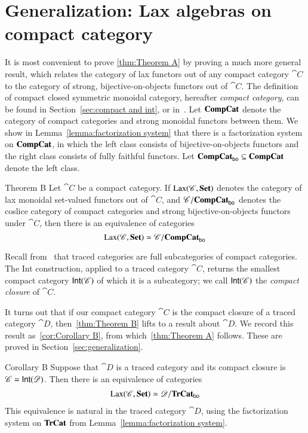 \documentclass[12pt,oneside,article,draft]{memoir}
\begin{document}
\section{Generalization: Lax algebras on compact category}

It is most convenient to prove \ref{thm:Theorem A} by proving a much more general result, which relates the category of lax functors out of any compact category $\cat{C}$ to the category of strong, bijective-on-objects functors out of $\cat{C}$. The definition of compact closed symmetric monoidal category, hereafter \emph{compact category}, can be found in Section~\ref{sec:compact and int}, or in~\cite{MacLane}. Let $\mathbf{CompCat}$ denote the category of compact categories and strong monoidal functors between them. We show in Lemma~\ref{lemma:factorization system} that there is a factorization system on $\mathbf{CompCat}$, in which the left class consists of bijective-on-objects functors and the right class consists of fully faithful functors. Let $\mathbf{CompCat}_{\mathsf{bo}}\subseteq\mathbf{CompCat}$ denote the left class.

\begin{named}{Theorem B}
 Let $\cat{C}$ be a compact category. If $\operatorname{Lax}(\mathscr{C},\mathbf{Set})$ denotes the category of lax monoidal set-valued functors out of $\cat{C}$, and $\mathscr{C}/\mathbf{CompCat}_{\mathsf{bo}}$ denotes the coslice category of compact categories and strong bijective-on-objects functors under $\cat{C}$, then there is an equivalence of categories
\begin{equation}\label{dia:compact lax strong}
  \operatorname{Lax}(\mathscr{C},\mathbf{Set})\simeq\mathscr{C}/\mathbf{CompCat}_{\mathsf{bo}}
\end{equation}
\end{named}


Recall from~\cite{JoyalStreetVerity} that traced categories are full subcategories of compact categories. The Int construction, applied to a traced category $\cat{C}$, returns the smallest compact category $\mathsf{Int}(\mathscr{C})$ of which it is a subcategory; we call $\mathsf{Int}(\mathscr{C})$ the \emph{compact closure} of $\cat{C}$. 

It turns out that if our compact category $\cat{C}$ is the compact closure of a traced category $\cat{D}$, then~\ref{thm:Theorem B} lifts to a result about $\cat{D}$. We record this result as~\ref{cor:Corollary B}, from which~\ref{thm:Theorem A} follows. These are proved in Section~\ref{sec:generalization}. 

\begin{named}{Corollary B}
Suppose that $\cat{D}$ is a traced category and its compact closure is $\mathscr{C}=\mathsf{Int}(\mathscr{D})$. Then there is an equivalence of categories
\begin{align}\label{dia:traced lax strong}
\operatorname{Lax}(\mathscr{C},\mathbf{Set})\simeq\mathscr{D}/\mathbf{TrCat}_{\mathsf{bo}}
\end{align}
This equivalence is natural in the traced category $\cat{D}$, using the factorization system on $\mathbf{TrCat}$ from Lemma~\ref{lemma:factorization system}.
\end{named}
\end{document}
